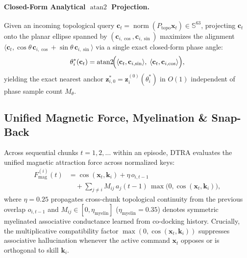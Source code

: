 \documentclass[10pt,twocolumn]{article}
\begin{document}
\paragraph{Closed-Form Analytical $\operatorname{atan2}$ Projection.}
Given an incoming topological query $\mathbf{c}_t = \operatorname{norm}(P_{\text{topo}}\mathbf{x}_t) \in \mathbb{S}^{63}$, projecting $\mathbf{c}_t$ onto the planar ellipse spanned by $(\mathbf{c}_{i,\cos}, \mathbf{c}_{i,\sin})$ maximizes the alignment $\langle \mathbf{c}_t, \cos\theta\,\mathbf{c}_{i,\cos} + \sin\theta\,\mathbf{c}_{i,\sin}\rangle$ via a single exact closed-form phase angle:
\begin{equation}
  \theta_i^*(\mathbf{c}_t) = \operatorname{atan2}\!\Bigl(\langle \mathbf{c}_t, \mathbf{c}_{i,\sin}\rangle,\; \langle \mathbf{c}_t, \mathbf{c}_{i,\cos}\rangle\Bigr),
\end{equation}
yielding the exact nearest anchor $\mathbf{z}_{i,0}^* = \mathbf{z}_i^{(0)}(\theta_i^*)$ in $O(1)$ independent of phase sample count $M_\theta$.

\subsection{Unified Magnetic Force, Myelination \& Snap-Back}
Across sequential chunks $t=1,2,\dots$ within an episode, DTRA evaluates the unified magnetic attraction force across normalized keys:
\begin{equation}
\begin{aligned}
  F_{\text{mag}}^{(i)}(t)
  &= \cos(\mathbf{x}_t, \mathbf{k}_i) + \eta\, o_{i, t-1} \\
  &\quad + \sum_{j \neq i} M_{ij}\, a_j(t-1)\,\max\!\bigl(0, \cos(\mathbf{x}_t, \mathbf{k}_i)\bigr),
\end{aligned}
\label{eq:fmag}
\end{equation}
where $\eta=0.25$ propagates cross-chunk topological continuity from the previous overlap $o_{i,t-1}$ and $M_{ij} \in [0, \eta_{\text{myelin}}]$ ($\eta_{\text{myelin}}=0.35$) denotes symmetric myelinated associative conductance learned from co-docking history. Crucially, the multiplicative compatibility factor $\max(0, \cos(\mathbf{x}_t, \mathbf{k}_i))$ suppresses associative hallucination whenever the active command $\mathbf{x}_t$ opposes or is orthogonal to skill $\mathbf{k}_i$.
\end{document}
